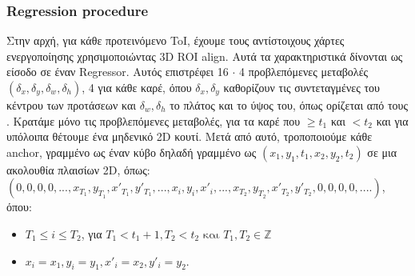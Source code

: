 \subsubsection{\en Regression procedure}
\gr Στην αρχή, για κάθε προτεινόμενο \en ToI\gr, έχουμε τους αντίστοιχους χάρτες ενεργοποίησης χρησιμοποιώντας \en 3D ROI align\gr. Αυτά τα χαρακτηριστικά δίνονται ως είσοδο σε έναν \en Regressor\gr.
Αυτός επιστρέφει 16 $\cdot$ 4 προβλεπόμενες μεταβολές $(\delta_x,\delta_y, \delta_w,\delta_h)$, 4 για κάθε καρέ, όπου $ \delta_x, \delta_y$ καθορίζουν τις συντεταγμένες του κέντρου των προτάσεων και
$\delta_w, \delta_h$ το πλάτος και το ύψος του, όπως ορίζεται από τους \en\cite{DBLP:journals/corr/GirshickDDM13}\gr.
Κρατάμε μόνο τις προβλεπόμενες μεταβολές, για τα καρέ που $\ge t_1$ και $< t_2$ και για υπόλοιπα θέτουμε ένα μηδενικό \en 2D \gr κουτί. 
Μετά από αυτό, τροποποιούμε κάθε \en anchor\gr, γραμμένο ως έναν κύβο δηλαδή γραμμένο ως $(x_1,y_1,t_1, x_2, y_2, t_2)$ σε μια ακολουθία πλαισίων \en 2D\gr, όπως: \\
$(0,0,0,0, ..., x_{T_1},y_{T_1},x'_{T_1},y'_{T_1}, ... ,x_{i},y_{i},x'_{i}, ..., x_{T_2},y_{T_2},x'_{T_2},y'_{T_2}, 0,0,0,0, ....)$, \\
όπου:
\begin{itemize}
\item $ T_1 \le i \le T_2$, για $T_1 < t_1 + 1,  T_2 < t_2 \text{ και }T_1,T_2 \in \mathbb{Z} $
\item $ x_i = x_1, y_i= y_1, x'_i = x_2, y'_i = y_2 $.
\end{itemize}

